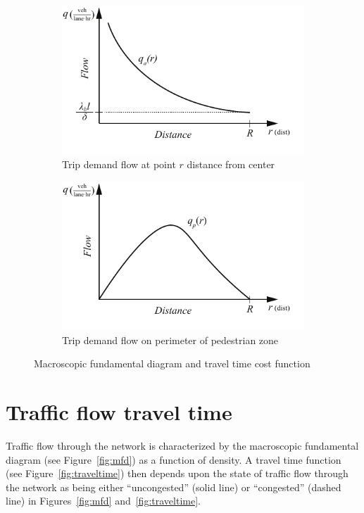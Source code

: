 \documentclass{article}
\begin{document}
\begin{figure}[!ht]
     \centering
     \hfill
     \begin{subfigure}[b]{0.45\textwidth}
         \centering
         \includegraphics[width=\textwidth]{diagram_flow_across}
         \caption{Trip demand flow at point $r$ distance from center}
         \label{fig:flowacross}
     \end{subfigure}
     \hfill
     \begin{subfigure}[b]{0.45\textwidth}
         \centering
         \includegraphics[width=\textwidth]{diagram_flow_perim}
         \caption{Trip demand flow on perimeter of pedestrian zone}
         \label{fig:perimflow}
     \end{subfigure}
     \hfill
     \caption{Macroscopic fundamental diagram and travel time cost function}
\end{figure}



\section{Traffic flow travel time}
Traffic flow through the network is characterized by the macroscopic fundamental diagram (see Figure~\ref{fig:mfd}) as a function of density. A travel time function (see Figure~\ref{fig:traveltime}) then depends upon the state of traffic flow through the network as being either ``uncongested'' (solid line) or ``congested'' (dashed line) in Figures~\ref{fig:mfd} and~\ref{fig:traveltime}.
\end{document}
